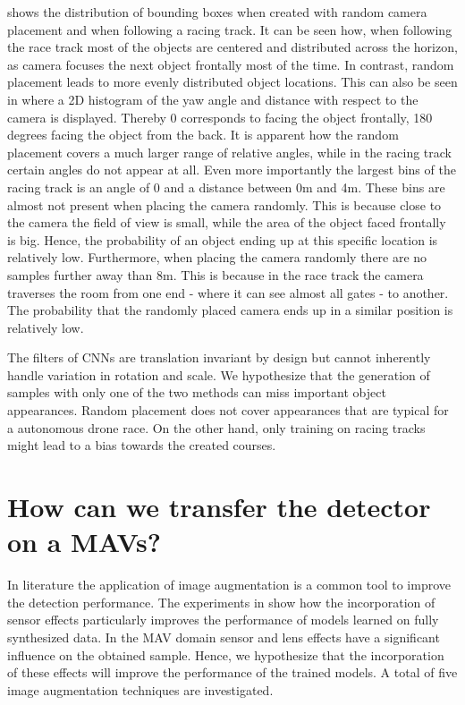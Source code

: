  shows the distribution of bounding boxes when created with random camera placement and when following a racing track. It can be seen how, when following the race track most of the objects are centered and distributed across the horizon, as camera focuses the next object frontally most of the time. In contrast, random placement leads to more evenly distributed object locations. This can also be seen in  where a 2D histogram of the yaw angle and distance with respect to the camera is displayed. Thereby 0 corresponds to facing the object frontally, 180 degrees facing the object from the back. It is apparent how the random placement covers a much larger range of relative angles, while in the racing track certain angles do not appear at all. Even more importantly the largest bins of the racing track is an angle of 0 and a distance between 0m and 4m. These bins are almost not present when placing the camera randomly. This is because close to the camera the field of view is small, while the area of the object faced frontally is big. Hence, the probability of an object ending up at this specific location is relatively low. Furthermore, when placing the camera randomly there are no samples further away than 8m. This is because in the race track the camera traverses the room from one end - where it can see almost all gates - to another. The probability that the randomly placed camera ends up in a similar position is relatively low.

The filters of \acp{CNN} are translation invariant by design but cannot inherently handle variation in rotation and scale. We hypothesize that the generation of samples with only one of the two methods can miss important object appearances. Random placement does not cover appearances that are typical for a autonomous drone race. On the other hand, only training on racing tracks might lead to a bias towards the created courses.

\section{How can we transfer the detector on a \acp{MAV}?}


In literature \cite{Krizhevsky2012a,Howard2013,Redmon,Liu} the application of image augmentation is a common tool to improve the detection performance. The experiments in \cite{Carlson2018} show how the incorporation of sensor effects particularly improves the performance of models learned on fully synthesized data. In the \ac{MAV} domain sensor and lens effects have a significant influence on the obtained sample. Hence, we hypothesize that the incorporation of these effects will improve the performance of the trained models. A total of  five image augmentation techniques are investigated.

